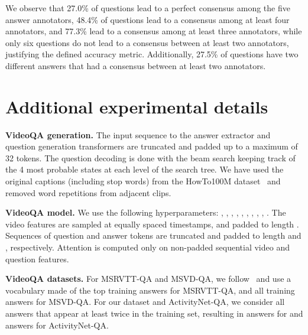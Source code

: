 We observe that 27.0\% of questions lead to a perfect consensus among the five answer annotators, 48.4\% of questions lead to a consensus among at least four annotators, and 77.3\% lead to a consensus among at least three annotators, while only six questions do not lead to a consensus between at least two annotators, justifying the defined accuracy metric. 
Additionally, 27.5\% of questions have two different answers that had a consensus between at least two annotators. 

\section{Additional experimental details}\label{sec:detailsbis}
\noindent \textbf{VideoQA generation.} The input sequence to the answer extractor and question generation transformers are truncated and padded up to a maximum of 32 tokens. 
The question decoding is done with the beam search keeping track of the 4 most probable states at each level of the search tree. 
We have used the original captions (including stop words) from the HowTo100M dataset~\cite{miech19howto100m} and removed word repetitions from adjacent clips.

\noindent \textbf{VideoQA model.} We use the following hyperparameters: , , , , , , , , , .
The video features are sampled at equally spaced timestamps, and padded to length . 
Sequences of question and answer tokens are truncated and padded to length  and , respectively. 
Attention is computed only on non-padded sequential video and question features. 


\noindent \textbf{VideoQA datasets.} For MSRVTT-QA and MSVD-QA, we follow~\cite{le2020hierarchical} and use a vocabulary made of the top  training answers for MSRVTT-QA, and all  training answers for MSVD-QA. 
For our \smalldatasetname{} dataset and ActivityNet-QA, we consider all answers that appear at least twice in the training set, resulting in  answers for \smalldatasetname{} and  answers for ActivityNet-QA.

